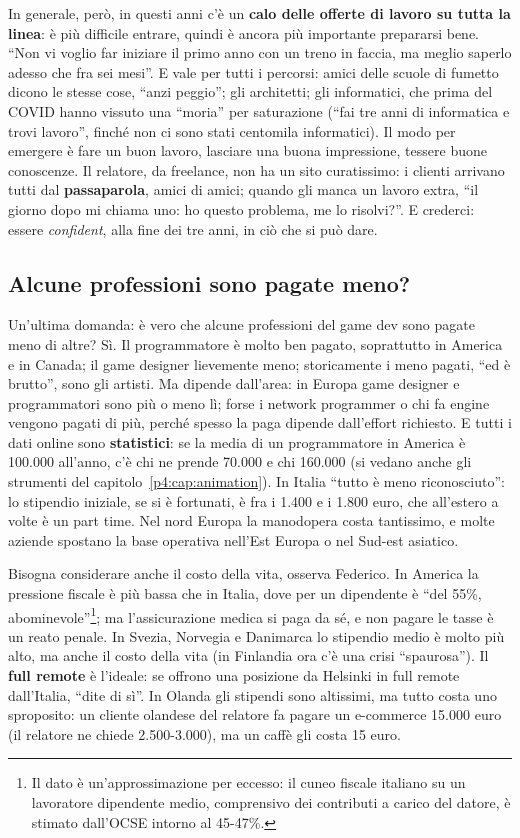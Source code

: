 In generale, però, in questi anni c'è un \textbf{calo delle offerte di lavoro su
tutta la linea}: è più difficile entrare, quindi è ancora più importante
prepararsi bene. ``Non vi voglio far iniziare il primo anno con un treno in
faccia, ma meglio saperlo adesso che fra sei mesi''. E vale per tutti i
percorsi: amici delle scuole di fumetto dicono le stesse cose, ``anzi peggio'';
gli architetti; gli informatici, che prima del COVID hanno vissuto una ``moria''
per saturazione (``fai tre anni di informatica e trovi lavoro'', finché non ci
sono stati centomila informatici). Il modo per emergere è fare un buon lavoro,
lasciare una buona impressione, tessere buone conoscenze. Il relatore, da
freelance, non ha un sito curatissimo: i clienti arrivano tutti dal
\textbf{passaparola}, amici di amici; quando gli manca un lavoro extra, ``il
giorno dopo mi chiama uno: ho questo problema, me lo risolvi?''. E crederci:
essere \emph{confident}, alla fine dei tre anni, in ciò che si può dare.

\subsection{Alcune professioni sono pagate meno?}

Un'ultima domanda: è vero che alcune professioni del game dev sono pagate meno
di altre? Sì. Il programmatore è molto ben pagato, soprattutto in America e in
Canada; il game designer lievemente meno; storicamente i meno pagati, ``ed è
brutto'', sono gli artisti. Ma dipende dall'area: in Europa game designer e
programmatori sono più o meno lì; forse i network programmer o chi fa engine
vengono pagati di più, perché spesso la paga dipende dall'effort richiesto. E
tutti i dati online sono \textbf{statistici}: se la media di un programmatore in
America è 100.000 all'anno, c'è chi ne prende 70.000 e chi 160.000 (si vedano
anche gli strumenti del capitolo~\ref{p4:cap:animation}). In Italia ``tutto è
meno riconosciuto'': lo stipendio iniziale, se si è fortunati, è fra i 1.400 e i
1.800 euro, che all'estero a volte è un part time. Nel nord Europa la manodopera
costa tantissimo, e molte aziende spostano la base operativa nell'Est Europa o
nel Sud-est asiatico.

Bisogna considerare anche il costo della vita, osserva Federico. In America la
pressione fiscale è più bassa che in Italia, dove per un dipendente è ``del
55\%, abominevole''\footnote{Il dato è un'approssimazione per eccesso: il cuneo
fiscale italiano su un lavoratore dipendente medio, comprensivo dei contributi a
carico del datore, è stimato dall'OCSE intorno al 45-47\%.}; ma l'assicurazione
medica si paga da sé, e non pagare le tasse è un reato penale. In Svezia,
Norvegia e Danimarca lo stipendio medio è molto più alto, ma anche il costo
della vita (in Finlandia ora c'è una crisi ``spaurosa''). Il \textbf{full remote}
è l'ideale: se offrono una posizione da Helsinki in full remote dall'Italia,
``dite di sì''. In Olanda gli stipendi sono altissimi, ma tutto costa uno
sproposito: un cliente olandese del relatore fa pagare un e-commerce 15.000
euro (il relatore ne chiede 2.500-3.000), ma un caffè gli costa 15 euro.

